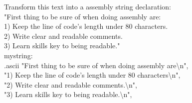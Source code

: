 \documentclass{article}
\begin{document}
\noindent Transform this text into a assembly string declaration:\\
"First thing to be sure of when doing assembly are:\\
1) Keep the line of code's length under 80 characters.\\
2) Write clear and readable comments.\\
3) Learn skills key to being readable."\\

\noindent mystring:\\
.ascii
"First thing to be sure of when doing assembly are\textbackslash n",\\
"1) Keep the line of code's length under 80 characters\textbackslash n",\\
"2) Write clear and readable comments.\textbackslash n",\\
"3) Learn skills key to being readable.\textbackslash n",\\
\end{document}
